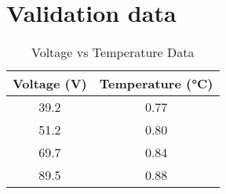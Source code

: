 \documentclass[a4paper,12pt]{article}
\begin{document}
\centering
\section{Validation data}
\begin{table}[h!]
\centering
\caption{Voltage vs Temperature Data}
\begin{tabular}{|c|c|}
\hline
\textbf{Voltage (V)} & \textbf{Temperature (°C)} \\
\hline
39.2 & 0.77 \\
51.2 & 0.80 \\
69.7 & 0.84 \\
89.5 & 0.88 \\
\hline
\end{tabular}
\end{table}
\end{document}

